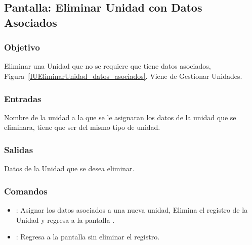 \subsection{Pantalla: Eliminar Unidad con Datos Asociados}

\subsubsection{Objetivo}
Eliminar una Unidad que no se requiere que tiene datos asociados, Figura~\ref{IUEliminarUnidad_datos_asociados}. Viene de Gestionar Unidades.


\subsubsection{Entradas}
Nombre de la unidad a la que se le asignaran los datos de la unidad que se eliminara, tiene que ser del mismo tipo de unidad.
\subsubsection{Salidas}
Datos de la Unidad que se desea eliminar.

\subsubsection{Comandos}
\begin{itemize}
 \item {}: Asignar los datos asociados a una nueva unidad, Elimina el registro de la Unidad y regresa a la pantalla . 
 \item {}: Regresa a la pantalla  sin eliminar el registro.
\end{itemize}
